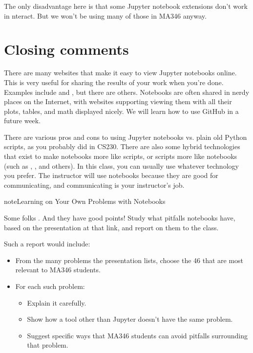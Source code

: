 \documentclass[letterpaper,10pt,english]{sphinxmanual}
\begin{document}
The only disadvantage here is that some Jupyter notebook extensions don’t work in nteract.  But we won’t be using many of those in MA346 anyway.


\section{Closing comments}
\label{\detokenize{chapter-3-jupyter:closing-comments}}
There are many websites that make it easy to view Jupyter notebooks online.  This is very useful for sharing the results of your work when you’re done.  Examples include  and , but there are others.  Notebooks are often shared in nerdy places on the Internet, with websites supporting viewing them with all their plots, tables, and math displayed nicely.  We will learn how to use GitHub in a future week.

There are various pros and cons to using Jupyter notebooks vs. plain old Python scripts, as you probably did in CS230.  There are also some hybrid technologies that exist to make notebooks more like scripts, or scripts more like notebooks (such as , , and others).  In this class, you can usually use whatever technology you prefer.  The instructor will use notebooks because they are good for communicating, and communicating is your instructor’s job.

\begin{sphinxadmonition}{note}{Learning on Your Own \sphinxhyphen{} Problems with Notebooks}

Some folks .  And they have good points!  Study what pitfalls notebooks have, based on the presentation at that link, and report on them to the class.
\end{sphinxadmonition}

Such a report would include:
\begin{itemize}
\item {} 
From the many problems the presentation lists, choose the 4\sphinxhyphen{}6 that are most relevant to MA346 students.

\item {} 
For each such problem:
\begin{itemize}
\item {} 
Explain it carefully.

\item {} 
Show how a tool other than Jupyter doesn’t have the same problem.

\item {} 
Suggest specific ways that MA346 students can avoid pitfalls surrounding that problem.

\end{itemize}

\end{itemize}
\end{document}
